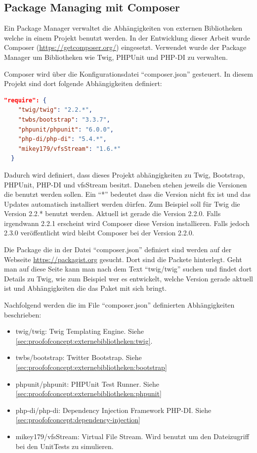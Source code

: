 \subsection{Package Managing mit Composer}
Ein Package Manager verwaltet die Abhängigkeiten von externen Bibliotheken welche in einem Projekt benutzt werden. In der Entwicklung dieser Arbeit wurde Composer (\url{https://getcomposer.org/}) eingesetzt. Verwendet wurde der Package Manager um Bibliotheken wie Twig, PHPUnit und PHP-DI zu verwalten.

Composer wird über die Konfigurationsdatei "`composer.json"' gesteuert. In diesem Projekt sind dort folgende Abhängigkeiten definiert:

\begin{lstlisting}[language=json]
  "require": {
    "twig/twig": "2.2.*",
    "twbs/bootstrap": "3.3.7",
    "phpunit/phpunit": "6.0.0",
    "php-di/php-di": "5.4.*",
    "mikey179/vfsStream": "1.6.*"
  }
\end{lstlisting}

Dadurch wird definiert, dass dieses Projekt abhängigkeiten zu Twig, Bootstrap, PHPUnit, PHP-DI und vfsStream besitzt. Daneben stehen jeweils die Versionen die benutzt werden sollen. Ein "`*"' bedeutet dass die Version nicht fix ist und das Updates automatisch installiert werden dürfen. Zum Beispiel soll für Twig die Version 2.2.* benutzt werden. Aktuell ist gerade die Version 2.2.0. Falls irgendwann 2.2.1 erscheint wird Composer diese Version installieren. Falls jedoch 2.3.0 veröffentlicht wird bleibt Composer bei der Version 2.2.0. 

Die Package die in der Datei "`composer.json"' definiert sind werden auf der Webseite \url{https://packagist.org} gesucht. Dort sind die Packete hinterlegt. Geht man auf diese Seite kann man nach dem Text "`twig/twig"' suchen und findet dort Details zu Twig, wie zum Beispiel wer es entwickelt, welche Version gerade aktuell ist und Abhängigkeiten die das Paket mit sich bringt.

Nachfolgend werden die im File "`composer.json"' definierten Abhängigkeiten beschrieben:
\begin{itemize}
	\item twig/twig: Twig Templating Engine. Siehe \cref{sec:proofofconcept:externebibliotheken:twig}.
	\item twbs/bootstrap: Twitter Bootstrap. Siehe \cref{sec:proofofconcept:externebibliotheken:bootstrap}
	\item phpunit/phpunit: PHPUnit Test Runner. Siehe \cref{sec:proofofconcept:externebibliotheken:phpunit}
	\item php-di/php-di: Dependency Injection Framework PHP-DI. Siehe \cref{sec:proofofconcept:dependency-injection}
	\item mikey179/vfsStream: Virtual File Stream. Wird benutzt um den Dateizugriff bei den UnitTests zu simulieren.
\end{itemize}

